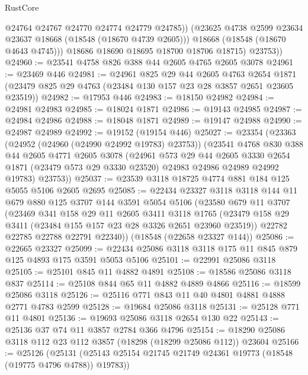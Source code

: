 \begin{lexlean}{RustCore}
\begin{coremodule}
                @24764
                @24767
                @24770
                @24774
                @24779
                @24785))
            (@23625 @4738 @2599 @23634 @23637 @18668 (@18548 (@18670 @4739 @2605)))
            @18668
            (@18548 (@18670 @4643 @4745)))
          @18686
          @18690
          @18695
          @18700
          @18706
          @18715)
        @23753))
@24960 := @23541 @4758 @826 @388 @44 @2605 @4765 @2605 @3078
@24961 := @23469 @446
@24981 := @24961
    @825
    @29
    @44
    @2605
    @4763
    @2654
    @1871
    (@23479 @825 @29 @4763 (@23484 @130 @157 @23 @28 @3857 @2651 @23605 @23519))
@24982 := @17953 @446
@24983 := @18150 @24982
@24984 := @24981 @24983
@24985 := @18024 @1871
@24986 := @19143 @24985
@24987 := @24984 @24986
@24988 := @18048 @1871
@24989 := @19147 @24988
@24990 := @24987 @24989
@24992 := @19152 (@19154 @446)
@25027 := @23354
    (@23363
      (@24952 (@24960 (@24990 @24992 @19783) @23753))
      (@23541
        @4768
        @830
        @388
        @44
        @2605
        @4771
        @2605
        @3078
        (@24961
          @573
          @29
          @44
          @2605
          @3330
          @2654
          @1871
          (@23479 @573 @29 @3330 @23520)
          @24983
          @24986
          @24989
          @24992
          @19783)
        @23753))
@25037 := @23539 @3118 @18725 @4774 @881 @184 @125 @5055 @5106 @2605 @2695
@25085 := @22434
    @23327
    @3118
    @3118
    @144
    @11
    @679
    @880
    @125
    @3707
    @144
    @3591
    @5054
    @5106
    (@23580
      @679
      @11
      @3707
      (@23469
        @341
        @158
        @29
        @11
        @2605
        @3411
        @3118
        @1765
        (@23479 @158 @29 @3411 (@23484 @155 @157 @23 @28 @3326 @2651 @23960 @23519))
        @22782
        @22785
        @22788
        @22791
        @22340))
    (@18548 (@22658 @23327 @144))
@25086 := @22665 @23327
@25099 := @22434 @25086 @3118 @3118 @175 @11 @845 @879 @125 @4893 @175 @3591 @5053 @5106
@25101 := @22991 @25086 @3118
@25105 := @25101 @845 @11 @4882 @4891
@25108 := @18586 @25086 @3118 @837
@25114 := @25108 @844 @65 @11 @4882 @4889 @4866
@25116 := @18599 @25086 @3118
@25126 := @25116 @771 @843 @11 @40 @4801 @4881 @4888 @2771 @4783 @2599
@25128 := @19684 @25086 @3118
@25131 := @25128 @771 @11 @4801
@25136 := @19693 @25086 @3118 @2654 @130 @22
@25143 := @25136 @37 @74 @11 @3857 @2784 @366 @4796
@25154 := @18290 @25086 @3118 @112 @23 @112 @3857 (@18298 (@18299 @25086 @112)) @23604
@25166 := @25126
    (@25131 (@25143 @25154 @21745 @21749 @24361 @19773 (@18548 (@19775 @4796 @4788)) @19783))

\end{coremodule}
\end{lexlean}
